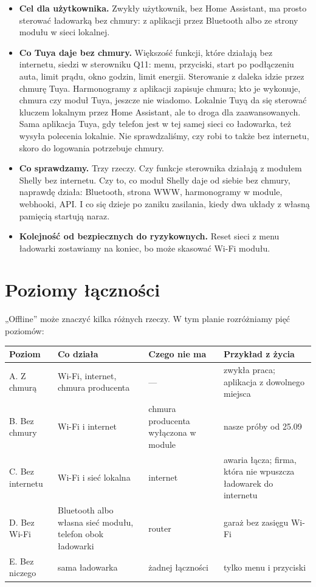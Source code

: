 \documentclass[11pt,a4paper]{article}
\begin{document}
\begin{itemize}
\item \textbf{Cel dla użytkownika.} Zwykły użytkownik, bez Home Assistant, ma prosto sterować ładowarką bez chmury: z aplikacji przez Bluetooth albo ze strony modułu w sieci lokalnej.
\item \textbf{Co Tuya daje bez chmury.} Większość funkcji, które działają bez internetu, siedzi w sterowniku Q11: menu, przyciski, start po podłączeniu auta, limit prądu, okno godzin, limit energii. Sterowanie z daleka idzie przez chmurę Tuya. Harmonogramy z aplikacji zapisuje chmura; kto je wykonuje, chmura czy moduł Tuya, jeszcze nie wiadomo. Lokalnie Tuyą da się sterować kluczem lokalnym przez Home Assistant, ale to droga dla zaawansowanych. Sama aplikacja Tuya, gdy telefon jest w tej samej sieci co ładowarka, też wysyła polecenia lokalnie. Nie sprawdzaliśmy, czy robi to także bez internetu, skoro do logowania potrzebuje chmury.
\item \textbf{Co sprawdzamy.} Trzy rzeczy. Czy funkcje sterownika działają z modułem Shelly bez internetu. Czy to, co moduł Shelly daje od siebie bez chmury, naprawdę działa: Bluetooth, strona WWW, harmonogramy w module, webhooki, API. I co się dzieje po zaniku zasilania, kiedy dwa układy z własną pamięcią startują naraz.
\item \textbf{Kolejność od bezpiecznych do ryzykownych.} Reset sieci z menu ładowarki zostawiamy na koniec, bo może skasować Wi-Fi modułu.
\end{itemize}

\section{Poziomy łączności}

„Offline” może znaczyć kilka różnych rzeczy. W tym planie rozróżniamy pięć poziomów:


\begin{longtable}{>{\raggedright\arraybackslash}p{3.00cm}>{\raggedright\arraybackslash}p{4.28cm}>{\raggedright\arraybackslash}p{2.25cm}>{\raggedright\arraybackslash}p{5.31cm}}
\toprule
\rowcolor{apteallight}\textbf{Poziom} & \textbf{Co działa} & \textbf{Czego nie ma} & \textbf{Przykład z życia} \\
\midrule\endhead
\bottomrule\endfoot
A. Z chmurą & Wi-Fi, internet, chmura producenta & — & zwykła praca; aplikacja z dowolnego miejsca \\
B. Bez chmury & Wi-Fi i internet & chmura producenta wyłączona w module & nasze próby od 25.09 \\
C. Bez internetu & Wi-Fi i sieć lokalna & internet & awaria łącza; firma, która nie wpuszcza ładowarek do internetu \\
D. Bez Wi-Fi & Bluetooth albo własna sieć modułu, telefon obok ładowarki & router & garaż bez zasięgu Wi-Fi \\
E. Bez niczego & sama ładowarka & żadnej łączności & tylko menu i przyciski \\
\end{longtable}
\end{document}

